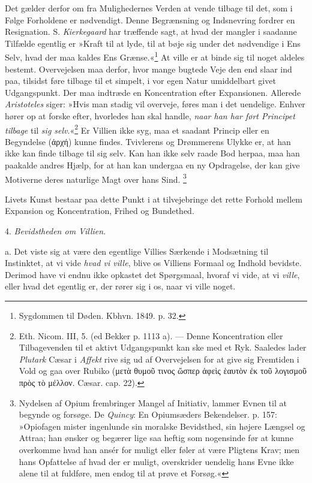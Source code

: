 \documentclass[12pt,a4paper,openany]{book}
\newcommand{\opage}[1]{\marginnote{\footnotesize\textit{[#1]}}}
\begin{document}
Det gælder derfor om fra Mulighedernes Verden at vende tilbage til det,
som i Følge Forholdene er nødvendigt. Denne Begrænsning og Indsnevring
fordrer en Resignation. S. \emph{Kierkegaard} har træffende sagt, at
hvad der mangler i saadanne Tilfælde egentlig er »Kraft til at lyde, til
at bøje sig under det nødvendige i Ens Selv, hvad der maa kaldes Ens
Grænse.«\footnote[2]{Sygdommen til Døden. Kbhvn. 1849. p. 32.} At ville
er at binde sig til noget aldeles bestemt. Overvejelsen maa derfor, hvor
mange bugtede Veje den end slaar ind paa, tilsidst føre tilbage til et
simpelt, i vor egen Natur umiddelbart givet Udgangspunkt. Der maa
indtræde en Koncentration efter Expansionen. Allerede \emph{Aristoteles}
siger: »Hvis man stadig vil overveje, føres man i det uendelige. Enhver
hører op at forske efter, hvorledes han skal handle, \emph{naar han har
ført Principet tilbage} til \emph{sig selv}.«\footnote[3]{Eth. Nicom.
III, 5. (ed Bekker p. 1113 a). --- Denne Koncentration eller
Tilbagevenden til et aktivt Udgangspunkt kan ske med et Ryk. Saaledes
lader \emph{Plutark} Cæsar i \emph{Affekt} rive sig ud af Overvejelsen
for at give sig Fremtiden i Vold og gaa over Rubiko (μετὰ θυμοῦ τινος
ὥσπερ ἀφεὶς ἑαυτὸν ἐκ τοῦ λογισμοῦ πρὸς τὸ μέλλον. Cæsar. cap. 22).} Er
Villien ikke syg, maa et saadant Princip eller en Begyndelse (ἀρχή)
kunne findes. Tvivlerens og Drømmerens Ulykke er, at han ikke kan finde
tilbage til sig selv. Kan han ikke selv raade Bod herpaa, maa han
paakalde andres Hjælp, for at han kan undergaa en ny Opdragelse, der kan
give Motiverne deres naturlige Magt over hans Sind.
\footnote[4]{Nydelsen af Opium frembringer Mangel af Initiativ, lammer
Evnen til at begynde og forsøge. De \emph{Quincy}: En Opiumsæders
Bekendelser. p. 157: »Opiofagen mister ingenlunde sin moralske
Bevidsthed, sin højere Længsel og Attraa; han ønsker og begærer lige saa
heftig som nogensinde før at kunne overkomme hvad han ansér for muligt
eller føler at være Pligtens Krav; men hans Opfattelse af hvad der er
muligt, overskrider uendelig hans Evne ikke alene til at fuldføre, men
endog til at prøve et Forsøg.«}


\opage{395}Livets Kunst bestaar paa dette Punkt i at tilvejebringe det
rette Forhold mellem Expansion og Koncentration, Frihed og Bundethed.

4. \emph{Bevidstheden om Villien}.

a. Det viste sig at være den egentlige Villies Særkende i Modsætning til
Instinktet, at vi vide \emph{hvad vi ville}, blive os Villiens Formaal
og Indhold bevidste. Derimod have vi endnu ikke opkastet det Spørgsmaal,
hvoraf vi vide, at vi \emph{ville}, eller hvad det egentlig er, der
rører sig i os, naar vi ville noget.
\end{document}
